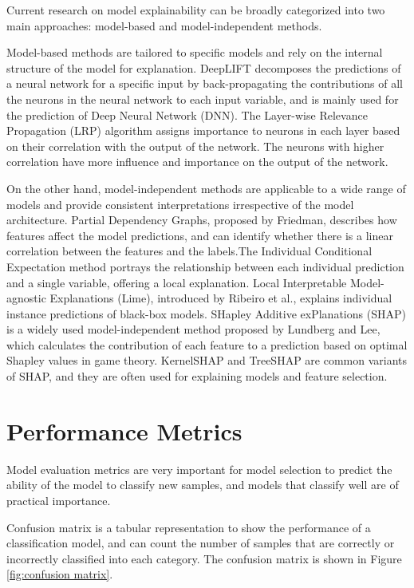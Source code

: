\documentclass[ %
                    author={Louis Wang},
                supervisor={Dr. Qiang Liu},
                    degree={MSc},
                     title={Identification of Suicide Ideation in Texts},
                      type={},
                      year={2024}]{dissertation}
\begin{document}
Current research on model explainability can be broadly categorized into two main approaches: model-based and model-independent methods.

Model-based methods are tailored to specific models and rely on the internal structure of the model for explanation. DeepLIFT\cite{shrikumar2017learning} decomposes the predictions of a neural network for a specific input by back-propagating the contributions of all the neurons in the neural network to each input variable, and is mainly used for the prediction of Deep Neural Network (DNN). The Layer-wise Relevance Propagation (LRP) algorithm\cite{bach2015pixel} assigns importance to neurons in each layer based on their correlation with the output of the network. The neurons with higher correlation have more influence and importance on the output of the network.

On the other hand, model-independent methods are applicable to a wide range of models and provide consistent interpretations irrespective of the model architecture. Partial Dependency Graphs, proposed by Friedman\cite{friedman2001greedy}, describes how features affect the model predictions, and can identify whether there is a linear correlation between the features and the labels.The Individual Conditional Expectation method\cite{goldstein2015peeking} portrays the relationship between each individual prediction and a single variable, offering a local explanation. Local Interpretable Model-agnostic Explanations (Lime), introduced by Ribeiro et al.\cite{ribeiro2016should}, explains individual instance predictions of black-box models. SHapley Additive exPlanations (SHAP) is a widely used model-independent method proposed by Lundberg and Lee\cite{lundberg2017unified}, which calculates the contribution of each feature to a prediction based on optimal Shapley values in game theory\cite{1953A}. KernelSHAP\cite{lundberg2017unified} and TreeSHAP\cite{lundberg2020local} are common variants of SHAP, and they are often used for explaining models and feature selection\cite{marcilio2020explanations}.

\section{Performance Metrics}
\noindent
Model evaluation metrics are very important for model selection to predict the ability of the model to classify new samples, and models that classify well are of practical importance. 

Confusion matrix\cite{1997Selecting} is a tabular representation to show the performance of a classification model, and can count the number of samples that are correctly or incorrectly classified into each category. The confusion matrix is shown in Figure \ref{fig:confusion matrix}.
\end{document}

